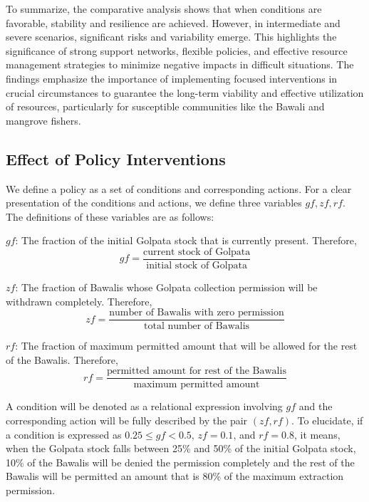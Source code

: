 \documentclass[final,5p,times,twocolumn,authoryear]{elsarticle}
\begin{document}
To summarize, the comparative analysis shows that when conditions are favorable, stability and resilience are achieved. However, in intermediate and severe scenarios, significant risks and variability emerge. This highlights the significance of strong support networks, flexible policies, and effective resource management strategies to minimize negative impacts in difficult situations. The findings emphasize the importance of implementing focused interventions in crucial circumstances to guarantee the long-term viability and effective utilization of resources, particularly for susceptible communities like the Bawali and mangrove fishers.
\FloatBarrier


\subsection{Effect of Policy Interventions}

We define a policy as a set of conditions and corresponding actions. For a clear presentation of the conditions and actions, we define three variables $ gf, zf, rf $. The definitions of these variables are as follows:


$gf$: The fraction of the initial Golpata stock that is currently present. Therefore,
\[
gf = \frac{\text{current stock of Golpata}}{\text{initial stock of Golpata}}
\]

$zf$: The fraction of Bawalis whose Golpata collection permission will be withdrawn completely. Therefore,
\[
zf = \frac{\text{number of Bawalis with zero permission}}{\text{total number of Bawalis}}
\]

$rf$: The fraction of maximum permitted amount that will be allowed for the rest of the Bawalis. Therefore,
\[
rf = \frac{\text{permitted amount for rest of the Bawalis}}{\text{maximum permitted amount}}
\]

A condition will be denoted as a relational expression involving $gf$ and the corresponding action will be fully described by the pair $(zf, rf)$. To elucidate, if a condition is expressed as $ 0.25 \leq gf < 0.5 $, $zf = 0.1$, and $rf = 0.8$, it means, when the Golpata stock falls between 25\% and 50\% of the initial Golpata stock, 10\% of the Bawalis will be denied the permission completely and the rest of the Bawalis will be permitted an amount that is 80\% of the maximum extraction permission.
\end{document}
